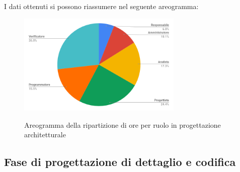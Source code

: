 \pagebreak
I dati ottenuti si possono riassumere nel seguente areogramma:
\begin{figure}[H] 
			\centering 
				\includegraphics[width=0.7\textwidth]{res/images/areogramma_architetturale.png}\\
				\caption{Areogramma della ripartizione di ore per ruolo in progettazione architetturale}
			\label{AreogrammaArchitetturale}
\end{figure}

\subsection{Fase di progettazione di dettaglio e codifica}
